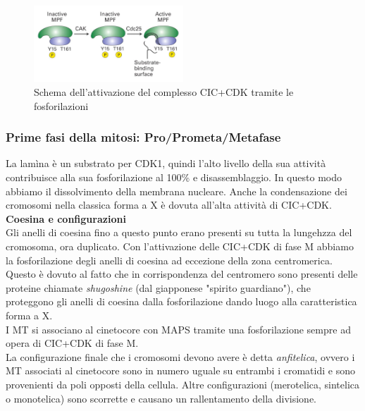             \begin{figure}[h]
                \centering
                \includegraphics[width=0.5\textwidth]{images/MPF_activation.JPG}
                \caption{\small Schema dell'attivazione del complesso CIC+CDK tramite le fosforilazioni}
                \label{fig:mesh1}
            \end{figure}
            
        \subsubsection{Prime fasi della mitosi: Pro/Prometa/Metafase}
            La lamìna è un substrato per CDK1, quindi l'alto livello della sua attività contribuisce alla sua fosforilazione al 100\% e disassemblaggio. In questo modo abbiamo il dissolvimento della membrana nucleare. 
            Anche la condensazione dei cromosomi nella classica forma a X è dovuta all'alta attività di CIC+CDK.\\
            
            \textbf{Coesina e configurazioni}\\
                Gli anelli di coesina fino a questo punto erano presenti su tutta la lungehzza del cromosoma, ora duplicato. Con l'attivazione delle CIC+CDK di fase M abbiamo la fosforilazione degli anelli di coesina ad eccezione della zona centromerica.
                Questo è dovuto al fatto che in corrispondenza del centromero sono presenti delle proteine chiamate \textit{shugoshine} (dal giapponese "spirito guardiano"), che proteggono gli anelli di coesina dalla fosforilazione dando luogo alla caratteristica forma a X.\\
                I MT si associano al cinetocore con MAPS tramite una fosforilazione sempre ad opera di CIC+CDK di fase M.\\
                La configurazione finale che i cromosomi devono avere è detta \textit{anfitelica}, ovvero i MT associati al cinetocore sono in numero uguale su entrambi i cromatidi e sono provenienti da poli opposti della cellula. Altre configurazioni (merotelica, sintelica o monotelica) sono scorrette e causano un rallentamento della divisione. 
            
